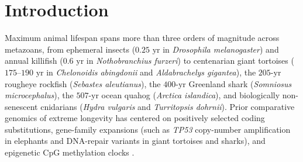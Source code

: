 \documentclass[11pt,a4paper]{article}
\renewcommand{\_}{\origunderscore\penalty200\relax}
\theoremstyle{remark}
\begin{document}
\section{Introduction}
Maximum animal lifespan spans more than three orders of magnitude across metazoans, from ephemeral insects ($0.25\text{ yr}$ in \textit{Drosophila melanogaster}) and annual killifish ($0.6\text{ yr}$ in \textit{Nothobranchius furzeri}) to centenarian giant tortoises ($175\text{--}190\text{ yr}$ in \textit{Chelonoidis abingdonii} and \textit{Aldabrachelys gigantea}), the $205\text{-yr}$ rougheye rockfish (\textit{Sebastes aleutianus}), the $400\text{-yr}$ Greenland shark (\textit{Somniosus microcephalus}), the $507\text{-yr}$ ocean quahog (\textit{Arctica islandica}), and biologically non-senescent cnidarians (\textit{Hydra vulgaris} and \textit{Turritopsis dohrnii}).
Prior comparative genomics of extreme longevity has centered on positively selected coding substitutions, gene-family expansions (such as \textit{TP53} copy-number amplification in elephants and DNA-repair variants in giant tortoises and sharks), and epigenetic CpG methylation clocks \cite{Quesada2019,Cilingir2022,Kolora2021,PascualTorner2022}.
\end{document}
